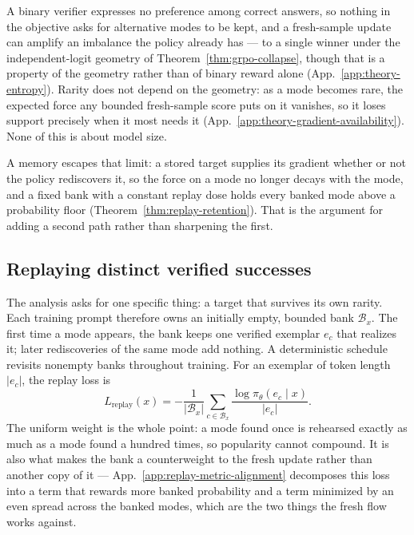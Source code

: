 \documentclass{article}
\newcommand{\1}{\mathbf 1}
\theoremstyle{remark}
\theoremstyle{definition}
\theoremstyle{plain}
\begin{document}
A binary verifier expresses no preference among correct answers, so nothing in
the objective asks for alternative modes to be kept, and a fresh-sample update
can amplify an imbalance the policy already has --- to a single winner under the
independent-logit geometry of Theorem~\ref{thm:grpo-collapse}, though that is a
property of the geometry rather than of binary reward alone
(App.~\ref{app:theory-entropy}). Rarity does not depend on the geometry: as a
mode becomes rare, the expected force any bounded fresh-sample score puts on it
vanishes, so it loses support precisely when it most needs it
(App.~\ref{app:theory-gradient-availability}). None of this is about model size.

A memory escapes that limit: a stored target supplies its gradient whether or
not the policy rediscovers it, so the force on a mode no longer decays with the
mode, and a fixed bank with a constant replay dose holds every banked mode
above a probability floor (Theorem~\ref{thm:replay-retention}). That is the
argument for adding a second path rather than sharpening the first.

\subsection{Replaying distinct verified successes}
\label{sec:replay}

The analysis asks for one specific thing: a target that survives its own rarity.
Each training prompt therefore owns an initially empty, bounded bank
$\mathcal B_x$. The first time a mode appears, the bank keeps one verified
exemplar $e_c$ that realizes it; later rediscoveries of the same mode add
nothing. A deterministic schedule revisits nonempty banks throughout training.
For an exemplar of token length $|e_c|$, the replay loss is
\begin{equation}
 L_{\mathrm{replay}}(x)=-\frac{1}{|\mathcal B_x|}
 \sum_{c\in\mathcal B_x}\frac{\log\pi_\theta(e_c\mid x)}{|e_c|}.
 \label{eq:lm-verified-replay}
\end{equation}
The uniform weight is the whole point: a mode found once is rehearsed exactly as
much as a mode found a hundred times, so popularity cannot compound. It is also
what makes the bank a counterweight to the fresh update rather than
another copy of it --- App.~\ref{app:replay-metric-alignment} decomposes this
loss into a term that rewards more banked probability and a term minimized by an
even spread across the banked modes, which are the two things the fresh flow
works against.
\end{document}
